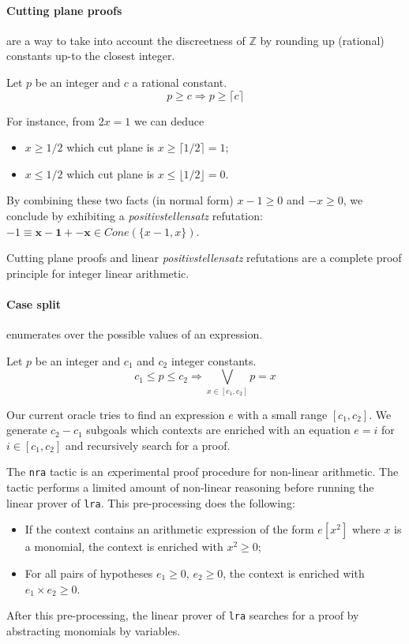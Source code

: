 \paragraph{Cutting plane proofs} are a way to take into account the discreetness of $\mathbb{Z}$ by rounding up
(rational) constants up-to the closest integer.
%
\begin{theorem}
  Let $p$ be an integer and $c$ a rational constant.
  \[
  p \ge c \Rightarrow p \ge \lceil c \rceil
  \]
\end{theorem}
For instance, from $2 x = 1$ we can deduce
\begin{itemize}
\item $x \ge 1/2$ which cut plane is $ x \ge \lceil 1/2 \rceil = 1$;
\item $ x \le 1/2$ which cut plane is $ x \le \lfloor 1/2 \rfloor = 0$.
\end{itemize}
By combining these two facts (in normal form) $x - 1 \ge 0$ and $-x \ge
0$, we conclude by exhibiting a \emph{positivstellensatz} refutation: $-1
\equiv \mathbf{x-1} + \mathbf{-x} \in \mathit{Cone}(\{x-1,x\})$.

Cutting plane proofs and linear \emph{positivstellensatz} refutations are a complete proof principle for integer linear arithmetic.

\paragraph{Case split} enumerates over the possible values of an expression.
\begin{theorem}
  Let $p$ be an integer and $c_1$ and $c_2$  integer constants.
  \[
  c_1 \le p \le c_2 \Rightarrow \bigvee_{x \in [c_1,c_2]} p = x
  \]
\end{theorem}
Our current oracle tries to find an expression $e$ with a small range $[c_1,c_2]$.
%
We generate $c_2 - c_1$ subgoals which contexts are enriched with an equation $e = i$ for $i \in [c_1,c_2]$ and
recursively search for a proof.


\label{sec:nra}
The {\tt nra} tactic is an {\emph experimental} proof procedure for non-linear arithmetic.
%
The tactic performs a limited amount of non-linear reasoning before running the
linear prover of {\tt lra}.
This pre-processing does the following:
\begin{itemize}
\item If the context contains an arithmetic expression of the form $e[x^2]$ where $x$ is a
  monomial, the context is enriched with $x^2\ge 0$;
\item For all pairs of hypotheses $e_1\ge 0$, $e_2 \ge 0$, the context is enriched with $e_1 \times e_2 \ge 0$.
\end{itemize}
After this pre-processing, the linear prover of {\tt lra} searches for a proof
by abstracting monomials by variables.

